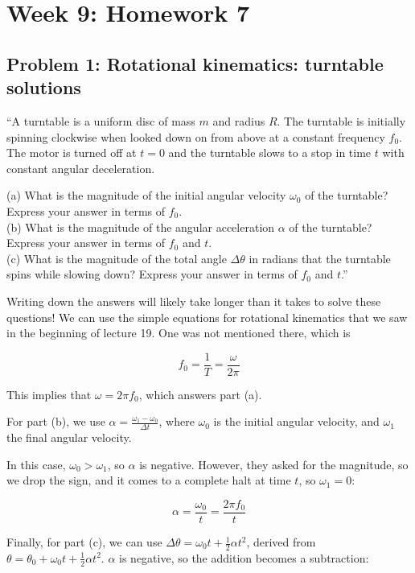 \documentclass[8.01x]{subfiles}
\begin{document}
\chapter{Week 9: Homework 7}

\section{Problem 1: Rotational kinematics: turntable solutions}

``A turntable is a uniform disc of mass $m$ and radius $R$. The turntable is initially spinning clockwise when looked down on from above at a constant frequency $f_0$. The motor is turned off at $t = 0$ and the turntable slows to a stop in time $t$ with constant angular deceleration.

(a) What is the magnitude of the initial angular velocity $\omega_0$ of the turntable? Express your answer in terms of $f_0$.\\
(b) What is the magnitude of the angular acceleration $\alpha$ of the turntable? Express your answer in terms of $f_0$ and $t$.\\
(c) What is the magnitude of the total angle $\Delta \theta$ in radians that the turntable spins while slowing down? Express your answer in terms of $f_0$ and $t$.''

Writing down the answers will likely take longer than it takes to solve these questions! We can use the simple equations for rotational kinematics that we saw in the beginning of lecture 19. One was not mentioned there, which is

\begin{equation}
f_0 = \frac{1}{T} = \frac{\omega}{2 \pi}
\end{equation}

This implies that $\omega = 2 \pi f_0$, which answers part (a).

For part (b), we use $\displaystyle \alpha = \frac{\omega_1 - \omega_0}{\Delta t}$, where $\omega_0$ is the initial angular velocity, and $\omega_1$ the final angular velocity.

In this case, $\omega_0 > \omega_1$, so $\alpha$ is negative. However, they asked for the magnitude, so we drop the sign, and it comes to a complete halt at time $t$, so $\omega_1 = 0$:

\begin{equation}
\alpha = \frac{\omega_0}{t} = \frac{2 \pi f_0}{t}
\end{equation}

Finally, for part (c), we can use $\Delta \theta = \omega_0 t + \frac{1}{2} \alpha t^2$, derived from $\displaystyle \theta = \theta_0 + \omega_0 t + \frac{1}{2} \alpha t^2$. $\alpha$ is negative, so the addition becomes a subtraction:
\end{document}
